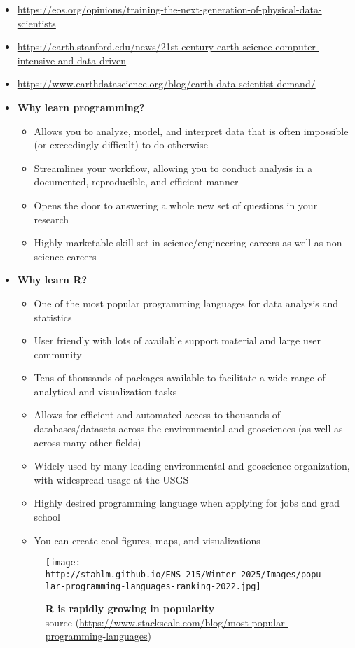 \documentclass[
]{article}
\providecommand{\tightlist}{%
  \setlength{\itemsep}{0pt}\setlength{\parskip}{0pt}}
\begin{document}
\begin{itemize}
\item
  \url{https://eos.org/opinions/training-the-next-generation-of-physical-data-scientists}
\item
  \url{https://earth.stanford.edu/news/21st-century-earth-science-computer-intensive-and-data-driven}
\item
  \url{https://www.earthdatascience.org/blog/earth-data-scientist-demand/}
\item
  \textbf{Why learn programming?}

  \begin{itemize}
  \tightlist
  \item
    Allows you to analyze, model, and interpret data that is often
    impossible (or exceedingly difficult) to do otherwise
  \item
    Streamlines your workflow, allowing you to conduct analysis in a
    documented, reproducible, and efficient manner
  \item
    Opens the door to answering a whole new set of questions in your
    research
  \item
    Highly marketable skill set in science/engineering careers as well
    as non-science careers
  \end{itemize}
\item
  \textbf{Why learn R?}

  \begin{itemize}
  \tightlist
  \item
    One of the most popular programming languages for data analysis and
    statistics
  \item
    User friendly with lots of available support material and large user
    community
  \item
    Tens of thousands of packages available to facilitate a wide range
    of analytical and visualization tasks
  \item
    Allows for efficient and automated access to thousands of
    databases/datasets across the environmental and geosciences (as well
    as across many other fields)\\
  \item
    Widely used by many leading environmental and geoscience
    organization, with widespread usage at the USGS
  \item
    Highly desired programming language when applying for jobs and grad
    school\\
  \item
    You can create cool figures, maps, and visualizations
  \end{itemize}

  \begin{figure}
  \centering
  \texttt{[image: http://stahlm.github.io/ENS\_215/Winter\_2025/Images/popular-programming-languages-ranking-2022.jpg]}
  \caption{\textbf{R is rapidly growing in popularity}\\
  source
  (\url{https://www.stackscale.com/blog/most-popular-programming-languages})}
  \end{figure}
\end{itemize}
\end{document}
